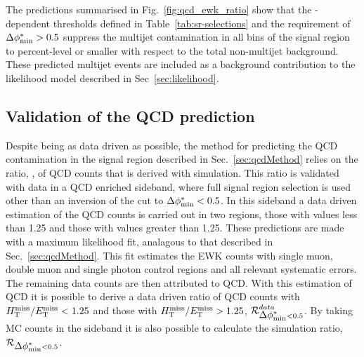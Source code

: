 
The predictions summarised in Fig.~\ref{fig:qcd_ewk_ratio} show that 
the \HT-dependent \alphat thresholds defined in Table~\ref{tab:sr-selections} 
and the requirement of $\mbox{$\Delta\phi^{*}_{\rm min}$} > 0.5$ suppress the multijet
contamination in all bins of the signal region to percent-level or smaller with
respect to the total non-multijet background. These predicted multijet events are 
included as a background contribution to the likelihood model
described in Sec~\ref{sec:likelihood}.


\subsection{Validation of the QCD prediction}
\label{sec:qcdValidation}

Despite being as data driven as possible, the method for predicting the QCD contamination in the signal region
described in Sec.~\ref{sec:qcdMethod} relies on the ratio, \rmhtmet,
of QCD counts
that is derived with simulation. This ratio is validated with data in a
QCD enriched sideband, where full signal region selection is used
other than
an inversion of the \bdphi cut to $\mbox{$\Delta\phi^{*}_{\rm min}$}<0.5$. In this sideband a
data driven estimation of the QCD counts is carried out in two regions, those with \mhtmet values less than
1.25 and those with values greater than 1.25. These predictions are
made with a maximum likelihood
fit, analagous to that described in Sec.~\ref{sec:qcdMethod}. This fit
estimates the EWK counts with single muon, double muon and single
photon control regions and all relevant systematic errors. The
remaining data counts are then attributed to QCD. With this estimation 
of QCD it is possible to derive a data driven ratio of QCD counts with 
$\mbox{$\mbox{$H_{\rm T}^{\rm miss}$} / \mbox{$E_\text{T}^{\rm miss}$}$}<1.25$ and those with $\mbox{$\mbox{$H_{\rm T}^{\rm miss}$} / \mbox{$E_\text{T}^{\rm miss}$}$}>1.25$, $\mbox{$\mathcal{R}$}_{\mbox{$\Delta\phi^{*}_{\rm min}$}<0.5}^{data}$. By
taking MC counts in the \bdphi sideband it is also possible to
calculate the \mhtmet simulation ratio, $\mbox{$\mathcal{R}$}_{\mbox{$\Delta\phi^{*}_{\rm min}$}<0.5}$. 

